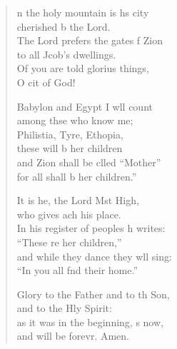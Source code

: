 \settowidth{\versewidth}{In his register of peoples he writes: *}
\begin{verse}%
  \begin{patverse}
n the holy mountain is h\pointup{\i}s city\Med\\
cherished b the Lord.\\
The Lord prefers the gates f Zion\Med\\
to all Jcob’s dwellings.\\
Of you are told glorius things,\Med\\
O cit of God!

Babylon and Egypt I w\pointup{\i}ll count\Med\\
among thse who know me;\\
Philistia, Tyre, Eth\pointup{\i}opia,\Med\\
these will b her children\\
and Zion shall be clled “Mother”\Med\\
for all shall b her children.”

It is he, the Lord Mst High,\Med\\
who gives ach his place.\\
In his register of peoples h writes:\Med\\
“These re her children,”\\
and while they dance they w\pointup{\i}ll sing:\Med\\
“In you all f\pointup{\i}nd their home.”

Glory to the Father and to th Son,\Med\\
and to the Hly Spirit:\\
as it was in the beginning, \pointup{\i}s now,\Med\\
and will be forevr. Amen.
  \end{patverse}
\end{verse}
